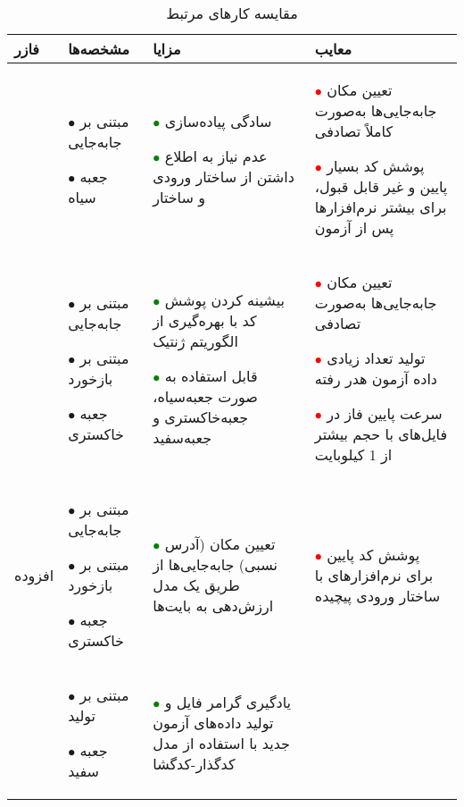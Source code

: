 \begin{table}%
	\caption{مقایسه کارهای مرتبط}
	\label{tabel:related-work}
	\centering
	\onehalfspacing
	\begin{tabularx}{\textwidth}{p{}p{}p{}p{}}
		
		\toprule[1.5pt] 
		فازر &
		مشخصه‌ها&
		مزایا&
		معایب\\
		\midrule[1.5pt]
		\lr{FileFuzz}\cite{Sutton:2007:FBF:1324770}&
		$\bullet$
		مبتنی بر جابه‌جایی
		
		$\bullet$
		جعبه ‌سیاه
		&
		
		\textcolor{green}{$\bullet$}
		سادگی پیاده‌سازی
		
	    \textcolor{green}{$\bullet$}
		عدم نیاز به اطلاع داشتن از ساختار ورودی و ساختار \lr{SUT}	
		&
		\textcolor{red}{$\bullet$}
		تعیین مکان جابه‌جایی‌ها به‌صورت کاملاً تصادفی
		
		\textcolor{red}{$\bullet$}
		پوشش کد بسیار پایین و غیر قابل قبول، برای بیشتر نرم‌افزارها پس از آزمون
		\\
		\hline  
		\lr{AFL}\cite{Zalewsky2013}&
			$\bullet$
		مبتنی بر جابه‌جایی
		
			$\bullet$
		مبتنی بر بازخورد
		
			$\bullet$
		جعبه ‌خاکستری
		&
		
		\textcolor{green}{$\bullet$}
		بیشینه کردن پوشش کد با بهره‌گیری از الگوریتم ژنتیک
		
		\textcolor{green}{$\bullet$}
		قابل استفاده به صورت جعبه‌سیاه، جعبه‌خاکستری و جعبه‌سفید	
		&
		\textcolor{red}{$\bullet$}
		تعیین مکان جابه‌جایی‌ها به‌صورت تصادفی
		
		\textcolor{red}{$\bullet$}
		تولید تعداد زیادی داده آزمون هدر رفته
		
		\textcolor{red}{$\bullet$}
		سرعت پایین فاز در فایل‌های با حجم بیشتر از 1 کیلوبایت
		\\
		\hline 
		\lr{َAFL}افزوده 
		\cite{DBLP:journals/corr/abs-1711-04596}&
			$\bullet$
		مبتنی بر جابه‌جایی
		
			$\bullet$
		مبتنی بر بازخورد
		
			$\bullet$
		جعبه ‌خاکستری&
			\textcolor{green}{$\bullet$}
		تعیین مکان (آدرس نسبی) جابه‌جایی‌ها از طریق یک مدل ارزش‌دهی به بایت‌ها&
			\textcolor{red}{$\bullet$}
		پوشش کد پایین برای نرم‌افزارهای با ساختار ورودی پیچیده
		\\
		\hline 
		\lr{Learn\&Fuzz} 
		\cite{Godefroid:2017:LML:3155562.3155573}&
		$\bullet$
		مبتنی بر تولید
		
		
		$\bullet$
		جعبه سفید&
		\textcolor{green}{$\bullet$}
		یادگیری گرامر فایل و تولید داده‌های آزمون جدید با استفاده از مدل‌ کدگذار-کدگشا
		

\end{tabularx}
\end{table}
